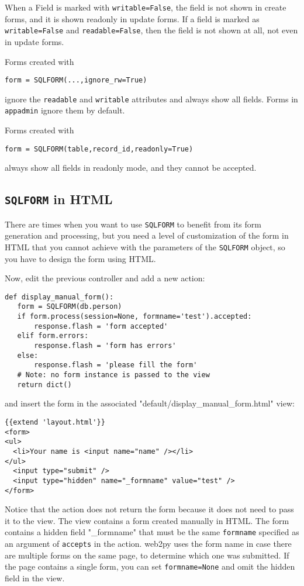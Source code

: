 \documentclass[justified,sixbynine,notoc]{tufte-book}
\def\ft{\small\tt}
\begin{document}
\begin{fullwidth}
When a Field is marked with {\ft writable=False}, the field is not shown in create forms, and it is shown readonly in update forms. If a field is marked as {\ft writable=False} and {\ft readable=False}, then the field is not shown at all, not even in update forms.

Forms created with
\begin{lstlisting}
form = SQLFORM(...,ignore_rw=True)
\end{lstlisting}
\noindent ignore the {\ft readable} and {\ft writable} attributes and always show all fields. Forms in {\ft appadmin} ignore them by default.

Forms created with
\begin{lstlisting}
form = SQLFORM(table,record_id,readonly=True)
\end{lstlisting}
\noindent always show all fields in readonly mode, and they cannot be accepted.

\goodbreak\subsection{{\ft SQLFORM} in HTML}

There are times when you want to use {\ft SQLFORM} to benefit from its form generation and processing, but you need a level of customization of the form in HTML that you cannot achieve with the parameters of the {\ft SQLFORM} object, so you have to design the form using HTML.

Now, edit the previous controller and add a new action:
\begin{lstlisting}
def display_manual_form():
   form = SQLFORM(db.person)
   if form.process(session=None, formname='test').accepted:
       response.flash = 'form accepted'
   elif form.errors:
       response.flash = 'form has errors'
   else:
       response.flash = 'please fill the form'
   # Note: no form instance is passed to the view
   return dict()
\end{lstlisting}
\noindent and insert the form in the associated "default/display\_manual\_form.html" view:
\begin{lstlisting}[keywords={}]
{{extend 'layout.html'}}
<form>
<ul>
  <li>Your name is <input name="name" /></li>
</ul>
  <input type="submit" />
  <input type="hidden" name="_formname" value="test" />
</form>
\end{lstlisting}

Notice that the action does not return the form because it does not need to pass it to the view. The view contains a form created manually in HTML. The form contains a hidden field "\_formname" that must be the same {\ft formname} specified as an argument of {\ft accepts} in the action. web2py uses the form name in case there are multiple forms on the same page, to determine which one was submitted. If the page contains a single form, you can set {\ft formname=None} and omit the hidden field in the view.


\end{fullwidth}
\end{document}
